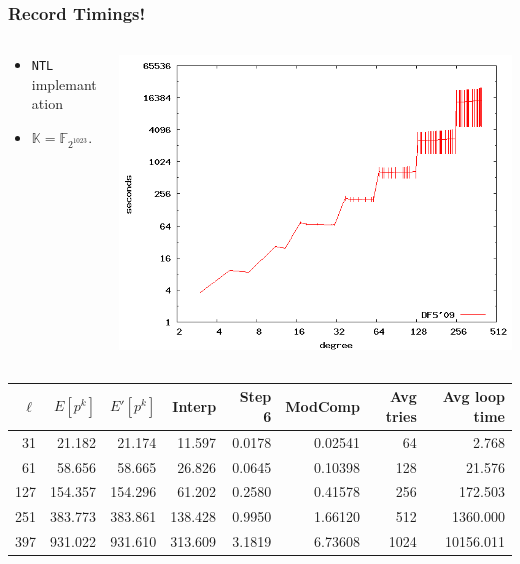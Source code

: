 \documentclass[10pt]{beamer}
\newcommand{\K}{\mathbb{K}}  %
\newcommand{\F}{\mathbb{F}}  %
\newcommand{\0}{\mathcal{O}}  %
\begin{document}

\begin{frame}
  \frametitle{Record Timings!}

  
  \begin{columns}
    \begin{column}{0.4\textwidth}
      \begin{itemize}
      \item \texttt{NTL} implemantation
      \item $\K = \F_{2^{1023}}$.
      \end{itemize}
    \end{column}
    \begin{column}{0.6\textwidth}
      \includegraphics[width=\textwidth]{2-1023}

    \end{column}
  \end{columns}
  
  \smallskip
  \footnotesize
  \centering
  \begin{tabular}{r r r r r r r r}
    \hline
    $\ell$ & $E[p^k]$ & $E'[p^k]$ & Interp & Step 6 & ModComp & Avg tries & Avg loop time\\
    \hline
    31 & 21.182 & 21.174 & 11.597 & 0.0178 & 0.02541 & 64 & 2.768 \\
    61 & 58.656 & 58.665 & 26.826 & 0.0645 & 0.10398 & 128 & 21.576 \\
    127 & 154.357 & 154.296 & 61.202 & 0.2580 & 0.41578 & 256 & 172.503 \\
    251 & 383.773 & 383.861 & 138.428 & 0.9950 & 1.66120 & 512 & 1360.000 \\
    397 & 931.022 & 931.610 & 313.609 & 3.1819 & 6.73608 & 1024 & 10156.011 \\
    \hline
  \end{tabular}
\end{frame}
\end{document}
